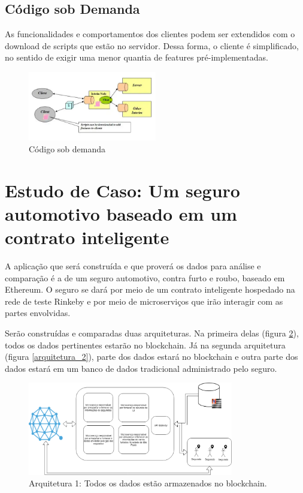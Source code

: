 \subsection{Código sob Demanda}

As funcionalidades e comportamentos dos clientes podem ser extendidos com o download de scripts que estão no servidor. Dessa forma, o cliente é simplificado, no sentido de exigir uma menor quantia de features pré-implementadas.

\begin{figure}[ht]
\centering
\includegraphics[width=0.5\textwidth]{Cap1/rest_code_on_demand}
\caption{Código sob demanda}
\label{rest_code_on_demand}
\end{figure}

\section{Estudo de Caso: Um seguro automotivo baseado em um contrato inteligente}

A aplicação que será construída e que proverá os dados para análise e comparação é a de um seguro automotivo, contra furto e roubo, baseado em Ethereum. O seguro se dará por meio de um contrato inteligente hospedado na rede de teste Rinkeby e por meio de microserviços que irão interagir com as partes envolvidas.

Serão construídas e comparadas duas arquiteturas. Na primeira delas (figura \ref{arquitetura_1}), todos os dados pertinentes estarão no blockchain. Já na segunda arquitetura (figura \ref{arquitetura_2}), parte dos dados estará no blockchain e outra parte dos dados estará em um banco de dados tradicional administrado pelo seguro.

\begin{figure}[ht]
\centering
\includegraphics[width=0.8\textwidth]{Cap1/arquitetura_1}
\caption{Arquitetura 1: Todos os dados estão armazenados no blockchain.}
\label{arquitetura_1}
\end{figure}

